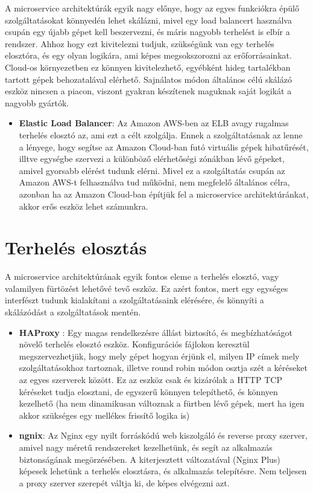 \documentclass[11pt,magyar,a4paper,oneside,]{report}
\providecommand{\tightlist}{%
  \setlength{\itemsep}{0pt}\setlength{\parskip}{0pt}}
\begin{document}
A microservice architektúrák egyik nagy előnye, hogy az egyes funkciókra
épülő szolgáltatásokat könnyedén lehet skálázni, mivel egy load
balancert használva csupán egy újabb gépet kell beszervezni, és máris
nagyobb terhelést is elbír a rendszer. Ahhoz hogy ezt kivitelezni
tudjuk, szükségünk van egy terhelés elosztóra, és egy olyan logikára,
ami képes megsokszorozni az erőforrásainkat. Cloud-os környezetben ez
könnyen kivitelezhető, egyébként hideg tartalékban tartott gépek
behozatalával elérhető. Sajnálatos módon általános célú skálázó eszköz
nincsen a piacon, viszont gyakran készítenek maguknak saját logikát a
nagyobb gyártók.

\begin{itemize}
\tightlist
\item
  \textbf{Elastic Load Balancer}\citep{elastic-load-balance}: Az Amazon
  AWS-ben az ELB avagy rugalmas terhelés elosztó az, ami ezt a célt
  szolgálja. Ennek a szolgáltatásnak az lenne a lényege, hogy segítse az
  Amazon Cloud-ban futó virtuális gépek hibatűrését, illtve egységbe
  szervezi a különböző elérhetőségi zónákban lévő gépeket, amivel
  gyorsabb elérést tudunk elérni. Mivel ez a szolgáltatás csupán az
  Amazon AWS-t felhasználva tud működni, nem megfelelő általános célra,
  azonban ha az Amazon Cloud-ban építjük fel a microservice
  architektúránkat, akkor erős eszköz lehet számunkra.
\end{itemize}

\section{Terhelés elosztás}\label{terheluxe9s-elosztuxe1s}

A microservice architektúrának egyik fontos eleme a terhelés elosztó,
vagy valamilyen fürtözést lehetővé tevő eszköz. Ez azért fontos, mert
egy egységes interfészt tudunk kialakítani a szolgáltatásaink elérésére,
és könnyíti a skálázódást a szolgáltatások mentén.

\begin{itemize}
\item
  \textbf{HAProxy}\citep{haproxy} \citep{LB-haproxy}: Egy magas
  rendelkezésre állást biztosító, és megbízhatóságot növelő terhelés
  elosztó eszköz. Konfigurációs fájlokon keresztül megszervezhetjük,
  hogy mely gépet hogyan érjünk el, milyen IP címek mely
  szolgáltatásokhoz tartoznak, illetve round robin módon osztja szét a
  kéréseket az egyes szerverek között. Ez az eszköz csak és kizárólak a
  HTTP TCP kéréseket tudja elosztani, de egyszerű könnyen telepíthető,
  és könnyen kezelhető (ha nem dinamikusan változnak a fürtben lévő
  gépek, mert ha igen akkor szükséges egy mellékes frissítő logika is)
\item
  \textbf{ngnix}\citep{nginx}: Az Nginx egy nyilt forráskódú web
  kiszolgáló és reverse proxy szerver, amivel nagy méretű rendszereket
  kezelhetünk, és segít az alkalmazás biztonságának megörzésében. A
  kiterjesztett változatával (Nginx Plus) képesek lehetünk a terhelés
  elosztásra, és alkalmazás telepítésre. Nem teljesen a proxy szerver
  szerepét váltja ki, de képes elvégezni azt.
\end{itemize}
\end{document}

